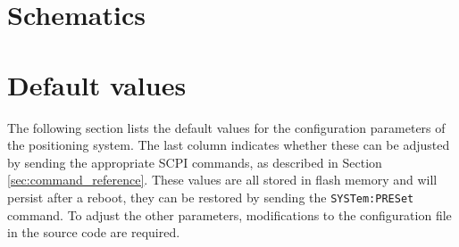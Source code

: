 \section{Schematics}



\section{Default values}

The following section lists the default values for the configuration parameters of the positioning system. The last column indicates whether these can be adjusted by sending the appropriate SCPI commands, as described in Section \ref{sec:command_reference}. These values are all stored in flash memory and will persist after a reboot, they can be restored by sending the \texttt{SYSTem:PRESet} command. To adjust the other parameters, modifications to the configuration file in the source code are required. 

